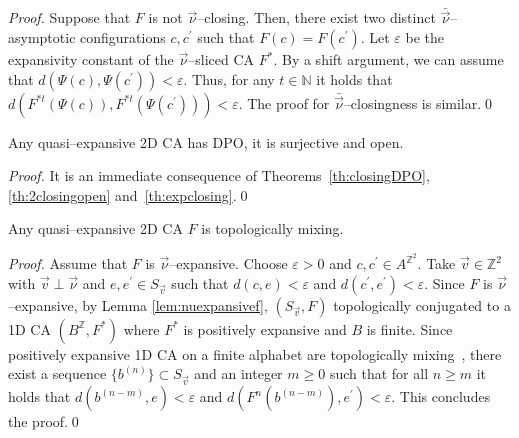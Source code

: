 \documentclass{llncs}
\newcommand{\z}{\ensuremath{\mathbb{Z}}\xspace}
\newcommand{\n}{\ensuremath{\mathbb{N}}\xspace}
\newcommand{\sv}{S_{\vec v}}
\newcommand{\bz}{\ensuremath{B^{\mathbb{Z}}}\xspace}
\newcommand{\zdu}{\ensuremath{\mathbb{Z}^2}\xspace}
\newcommand{\azdu}{\ensuremath{A^{\zdu}}\xspace}
\newcommand{\para}[1]{(#1)}
\newcommand{\nn}{\vec\nu}
\newcommand{\vv}{\vec v}
\newcommand{\ignore}[1]{}
\begin{document}
\begin{proof}
Suppose that $F$ is not $\nn$--closing. Then, there exist two
distinct $\bar{\nn}$--a\-sym\-pto\-tic configurations $c,c^\prime$ such
that $F(c)=F(c^\prime)$. Let $\varepsilon$ be the expansivity
constant of the $\nn$--sliced CA $F^*$. By a shift argument, we
can assume that $d(\Psi(c),\Psi(c^\prime))<\varepsilon$. Thus, for
any $t\in\n$ it holds that $d(F^{*t}(\Psi(c)),
F^{*t}(\Psi(c^\prime)))<\varepsilon$. The proof for $\bar{\nn}$--closingness is similar.\qed
\ignore{We show that $F$ is $\nn$--closing. Fix $\vv\in\zdu$ with
$\vv\perp\nn$ and for any integer $n>0$ denote
$S^\prime_n=S_{n\vv}$. By Lemma~\ref{lem:nuexpansivef}, for any
$n>0$, the CA $\para{\bz, F^*}$ conjugated to $\para{S^\prime_n,
F^*}$ is positively expansive and then, by a well known result
in~\cite{kurka04,nasu95}, it is both right and left closing. Thus, for
any $n>0$ and for any pair of distinct $\bar{\nn}$-asymptotic
configurations $a,b\in S^\prime_n$ it holds that $F(a)\neq F(b)$.
Let $c,c^\prime\in\azdu$ be two distinct $\bar{\nn}$-asymptotic
configurations. There exists a sequence $(a^{(n)},b^{(n)})\in
S^{\prime 2}_n$ of pairs of distinct $\bar{\nn}$-asymptotic
configurations converging to $(c,c^\prime)$ and such that
$F(a^{(n)})\neq F(b^{(n)})$. This assures that $F(c)\neq
F(c^\prime)$.
}
\end{proof}
\begin{corollary}\label{cor:quasiexp-dpo-surj-op}
Any quasi--expansive 2D CA has DPO, it is surjective and open.
\end{corollary}
\begin{proof}
It is an immediate consequence of Theorems~\ref{th:closingDPO},
\ref{th:2closingopen} and~\ref{th:expclosing}.\qed
\end{proof}
\begin{theorem}
\label{th:expmixing} Any quasi--expansive 2D CA $F$ is
topologically mixing.
\end{theorem}
\begin{proof}
Assume that $F$ is $\nn$--expansive. Choose $\varepsilon>0$ and
$c,c^{\prime}\in\azdu$. Take $\vv\in\zdu$ with $\vv\perp\nn$ and $e,
e^{\prime}\in\sv$ such that $d(c,e)<\varepsilon$ and
$d(c^{\prime}, e^{\prime})<\varepsilon$. Since $F$ is
$\nn$--expansive, by Lemma \ref{lem:nuexpansivef}, $\para{\sv, F}$
topologically conjugated to a 1D CA $\para{B^{\z},F^*}$ where
$F^*$ is positively expansive and $B$ is finite. Since positively
expansive 1D CA on a finite alphabet are topologically
mixing~\cite{kurka97,blanchard97}, there exist a sequence
$\{b^{(n)}\}\subset\sv$ and an integer $m\geq 0$ such that for all
$n\geq m$ it holds that $d(b^{(n-m)},e)<\varepsilon$ and
$d(F^n(b^{(n-m)}),e^\prime)<\varepsilon$. This concludes the
proof.\qed
\end{proof}
\end{document}
